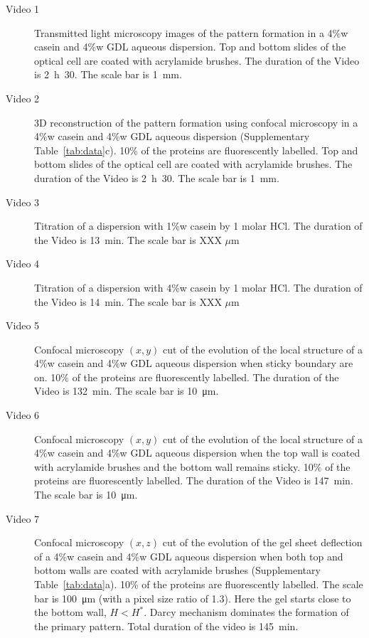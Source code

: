\documentclass[twocolumn,superscriptaddress,showpacs,preprintnumbers,
amsmath,amssymb,prl]{revtex4-1}
\begin{document}
\begin{description}
\item[Video 1] Transmitted light microscopy images of the pattern formation in a 4\%w casein and 4\%w GDL aqueous dispersion. Top and bottom slides of the optical cell are coated with acrylamide brushes. The duration of the Video is \SI{2}{\hour}~30. The scale bar is \SI{1}{\milli\metre}.

\item[Video 2] 3D reconstruction of the pattern formation using confocal microscopy in a 4\%w casein and 4\%w GDL aqueous dispersion (Supplementary Table~\ref{tab:data}c). 10\% of the proteins are fluorescently labelled. Top and bottom slides of the optical cell are coated with acrylamide brushes. The duration of the Video is \SI{2}{\hour}~30. The scale bar is \SI{1}{\milli\metre}.


\item[Video 3] Titration of a dispersion with 1\%w casein by 1 molar HCl. The duration of the Video is \SI{13}{\minute}. The scale bar is XXX $\mu$m


\item[Video 4] Titration of a dispersion with 4\%w casein by 1 molar HCl. The duration of the Video is \SI{14}{\minute}. The scale bar is XXX $\mu$m


\item[Video 5] Confocal microscopy $(x,y)$ cut of the evolution of the local structure of a 4\%w casein and 4\%w GDL aqueous dispersion when sticky boundary are on. 10\% of the proteins are fluorescently labelled. The duration of the Video is \SI{132}{\minute}. The scale bar is \SI{10}{\micro\metre}.

\item[Video 6] Confocal microscopy $(x,y)$ cut of the evolution of the local structure of a 4\%w casein and 4\%w GDL aqueous dispersion when the top wall is coated with acrylamide brushes and the bottom wall remains sticky. 10\% of the proteins are fluorescently labelled. The duration of the Video is \SI{147}{\minute}. The scale bar is \SI{10}{\micro\metre}.

\item[Video 7] Confocal microscopy $(x,z)$ cut of the evolution of the gel sheet deflection of a 4\%w casein and 4\%w GDL aqueous dispersion when both top and bottom walls are coated with acrylamide brushes (Supplementary Table~\ref{tab:data}a). 10\% of the proteins are fluorescently labelled. The scale bar is \SI{100}{\micro\metre} (with a pixel size ratio of 1.3). Here the gel starts close to the bottom wall, $H<H^*$. Darcy mechanism dominates the formation of the primary pattern. Total duration of the video is \SI{145}{\minute}.


\end{description}
\end{document}
